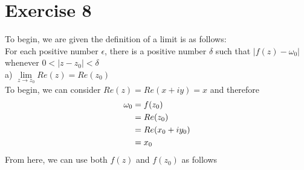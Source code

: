 \documentclass[notitlepage]{article}
\begin{document}
\section*{Exercise 8}

    \hspace{1cm} To begin, we are given the definition of a limit is as follows: \\
     For each positive number $\epsilon$, there is a positive number $\delta$ such that
    $|f(z) - \omega_0|$ whenever $0 < |z-z_0| < \delta$ \\
    a) $\lim\limits_{z \to z_0}Re(z)=Re(z_0)$ \\
        To begin, we can consider $Re(z) = Re(x+iy) = x$ and therefore
\begin{equation}
    \begin{split}
        \omega_0    &= f(z_0) \notag\\
                    &= Re(z_0) \\
                    &= Re(x_0+iy_0) \\
                    &= x_0 \\
    \end{split}
\end{equation}
    From here, we can use both $f(z)$ and $f(z_0)$ as follows
\end{document}
